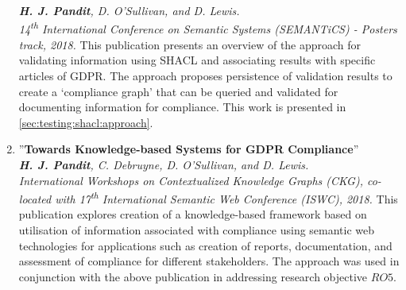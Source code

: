 \begin{enumerate}[resume]
    \textit{\textbf{H. J. Pandit}, D. O’Sullivan, and D. Lewis.} \\ 
    \textit{14\textsuperscript{th} International Conference on Semantic Systems (SEMANTiCS) - Posters track, 2018.}
        \vspace{0.1cm} \newline
        This publication presents an overview of the approach for validating information using SHACL and associating results with specific articles of GDPR. The approach proposes persistence of validation results to create a `compliance graph' that can be queried and validated for documenting information for compliance. This work is presented in \autoref{sec:testing:shacl:approach}.
    \item ''\textbf{Towards Knowledge-based Systems for GDPR Compliance}'' \cite{pandit_towards_2018} \\
    \textit{\textbf{H. J. Pandit}, C. Debruyne, D. O’Sullivan, and D. Lewis.} \\ 
    \textit{International Workshops on Contextualized Knowledge Graphs (CKG), co-located with 17\textsuperscript{th} International Semantic Web Conference (ISWC), 2018.}
        \vspace{0.1cm} \newline 
        This publication explores creation of a knowledge-based framework based on utilisation of information associated with compliance using semantic web technologies for applications such as creation of reports, documentation, and assessment of compliance for different stakeholders. The approach was used in conjunction with the above publication in addressing research objective $RO5$.
\end{enumerate}

